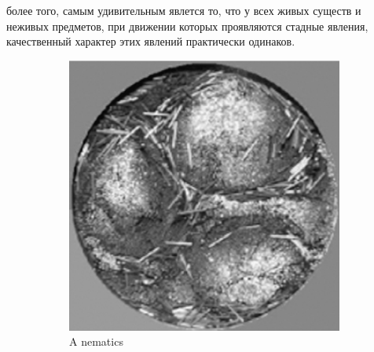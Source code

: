 	более того, самым удивительным явлется то, что у всех живых существ и неживых предметов, при движении которых проявляются стадные явления, качественный характер этих явлений практически одинаков. %
	\begin{figure}
        \centering
        \begin{subfigure}{.4\columnwidth}
                \includegraphics[width=\columnwidth]{Fig4_CollectiveMotion}
                \caption{A nematics}
                \label{fig:CollMot:nematics}
        \end{subfigure}%
        ~ %
        \begin{subfigure}{.4\columnwidth}

\end{subfigure}
\end{figure}
